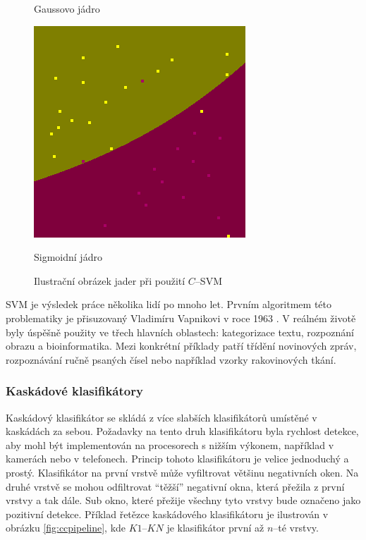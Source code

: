 \begin{figure}[ht]
\begin{minipage}[b]{0.5\linewidth}
    \caption*{Gaussovo jádro} 
    \vspace{4ex}
    \label{rbfKernel} 
  \end{minipage}%
  \begin{minipage}[b]{0.5\linewidth}
    \centering
    \includegraphics[width=.6\linewidth]{figures/sigm}
    \caption*{Sigmoidní jádro} 
    \vspace{4ex}
    \label{sigmKernel} 
  \end{minipage} 
  \caption{Ilustrační obrázek jader při použití $C$--SVM \cite{libsvm}}
  \label{kernels} 
\end{figure}

SVM je výsledek práce několika lidí po mnoho let. Prvním algoritmem této problematiky je přisuzovaný Vladimíru Vapnikovi v roce 1963 \cite{svm:vapnik}. V reálném životě byly úspěšně použity ve třech hlavních oblastech: kategorizace textu, rozpoznání obrazu a bioinformatika. Mezi konkrétní příklady patří třídění novinových zpráv, rozpoznávání ručně psaných čísel nebo například vzorky rakovinových tkání.

\subsubsection*{Kaskádové klasifikátory} %
Kaskádový klasifikátor se skládá z více slabších klasifikátorů umístěné v kaskádách za sebou. Požadavky na tento druh klasifikátoru byla rychlost detekce, aby mohl být implementován na procesorech s nižším výkonem, například v kamerách nebo v telefonech. Princip tohoto klasifikátoru je velice jednoduchý a prostý. Klasifikátor na první vrstvě může vyfiltrovat většinu negativních oken. Na druhé vrstvě se mohou odfiltrovat ``těžší'' negativní okna, která přežila z první vrstvy a tak dále. Sub okno, které přežije všechny tyto vrstvy bude označeno jako pozitivní detekce. Příklad řetězce kaskádového klasifikátoru je ilustrován v obrázku \ref{fig:ccpipeline}, kde $K1$--$KN$ je klasifikátor první až $n$--té vrstvy.

